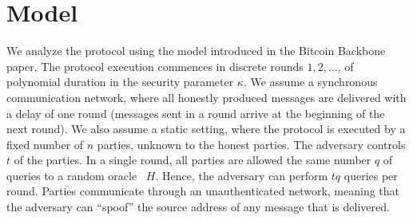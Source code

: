 \section{Model}

We analyze the protocol using the model introduced in the Bitcoin Backbone~\cite{backbone} paper.
The protocol execution commences in discrete rounds $1, 2, \ldots$, of polynomial duration in the
security parameter $\kappa$.
We assume a synchronous communication network, where all honestly produced
messages are delivered with a delay of one round (messages sent in a round
arrive at the beginning of the next round).
We also assume a static setting, where the protocol is executed by
a fixed number of $n$ parties, unknown to the honest parties.
The adversary controls $t$ of the parties.
In a single round, all parties are allowed the same number $q$ of queries to
a random oracle~\cite{ro} $H$. Hence, the adversary can perform $t q$ queries
per round.
Parties communicate through an unauthenticated network,
meaning that the adversary can ``spoof'' %
the source address of any message that is delivered.
